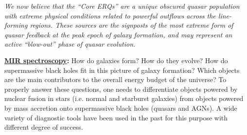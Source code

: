\smallskip
\smallskip
\noindent
{\it We now believe that the ``Core ERQs'' are a unique obscured quasar population
with extreme physical conditions related to powerful outflows across
the line-forming regions. These sources are the signposts of the most extreme form of
quasar feedback at the peak epoch of galaxy formation, and may
represent an active ``blow-out'' phase of quasar evolution. 
}


\medskip
\medskip
\smallskip
\smallskip
\noindent
{\bf \underline{MIR spectroscopy}:}
How do galaxies form? How do they evolve? How do supermassive black holes fit in this picture of galaxy formation? Which objects are the main contributors to the overall energy budget of the universe? To properly answer these questions, one needs to differentiate objects powered by nuclear fusion in stars (i.e. normal and starburst galaxies) from objects powered by mass accretion onto supermassive black holes (quasars and AGNs). A wide variety of diagnostic tools have been used in the past for this purpose with different degree of success.

\iffalse
Direct spectroscopy searches for the presence of the broad recombination lines at wavelengths where the effects of dust extinction are reduced.
We follow ``Veilleux's Commandments'':
\begin{itemize}
\item Thou shalt use lines which emphasize the differences between H II regions and AGNs; i.e., use high-ionization lines or low-ionization lines produced in the partially ionized zone. 
\item Thou shalt use strong lines which are easy to measure in typical spectra.
\item Thou shalt avoid lines which are badly blended with other emission or absorption line features.
\item Thou shalt use lines with small wavelength separation to minimize sensitivity to reddening.
\item Thou shalt use line ratios from the same elements or involving hydrogen recombination lines to eliminate or reduce abundance dependence.
\item Thou shalt avoid lines from Mg, Si, Ca, Fe – depleted onto dust grains. 
\item Thou shalt avoid lines affected by strong stellar absorption features. 
\item Thou shalt avoid lines affected by strong atmospheric features.
\item Thou shalt use lines at long wavelengths to reduce the effects of dust extinction.
\end{itemize}
\fi

